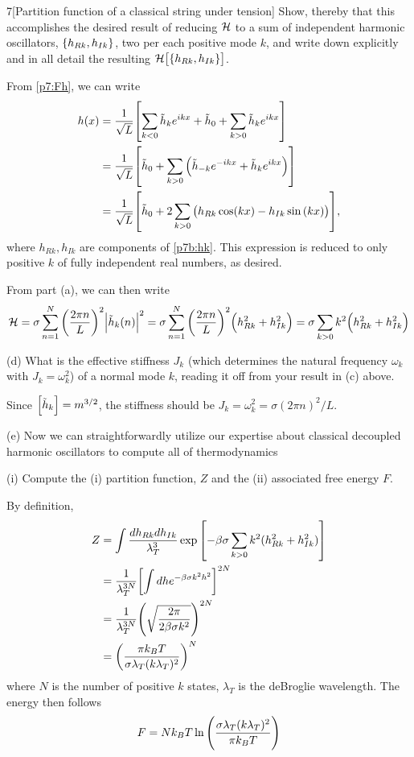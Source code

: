 \documentclass[12pt]{article}
\begin{document}
\begin{problem}{7}[Partition function of a classical string under tension]
Show, thereby that this accomplishes the desired result of reducing $\mathcal{H}$ to a
sum of independent harmonic oscillators, $\qty{h_{Rk},h_{Ik}}$, two per each
positive mode $k$, and write down explicitly and in all detail the resulting
$\mathcal{H}\qty[\qty{h_{Rk},h_{Ik}}]$.
\begin{solution}
From \eqref{p7:Fh}, we can write
\begin{align}
h(x)
&=\frac1{\sqrt{L}}\qty[\sum_{k<0}\tilde{h}_ke^{ikx}+\tilde{h}_0+\sum_{k>0}\tilde{h}_ke^{ikx}]\notag\\
&=\frac1{\sqrt{L}}\qty[
\tilde{h}_0+\sum_{k>0}\qty(\tilde{h}_{-k}e^{-ikx}+\tilde{h}_ke^{ikx})
]\notag\\
&=\frac1{\sqrt{L}}
\qty[
\tilde{h}_0
+2\sum_{k>0}\qty(h_{Rk}\cos(kx)-h_{Ik}\sin\qty(kx))
],
\end{align}
where $h_{Rk},h_{Ik}$ are components of \eqref{p7b:hk}. This expression is
reduced to only positive $k$ of fully independent real numbers, as desired.

From part (a), we can then write
\begin{equation}
    \mathcal{H}=\sigma\sum_{n=1}^N\qty(\frac{2\pi n}{L})^2\abs{\tilde{h}_k(n)}^2
    =\sigma\sum_{n=1}^N\qty(\frac{2\pi n}{L})^2\qty(h_{Rk}^2+h_{Ik}^2)
    =\sigma\sum_{k>0}k^2\qty(h_{Rk}^2+h_{Ik}^2)
\end{equation}
\end{solution}

(d) What is the effective stiffness $J_k$ (which determines the natural
frequency $\omega_k$ with $J_k=\omega_k^2$) of a normal mode $k$, reading it off
from your result in (c) above.

\begin{solution}
Since $\qty[\tilde{h}_k]=m^{3/2}$, the stiffness should be
$J_k=\omega_k^2=\sigma(2\pi n)^2/L$. 
\end{solution}

(e) Now we can straightforwardly utilize our expertise about classical decoupled
harmonic oscillators to compute all of thermodynamics

\qquad(i) Compute the (i) partition function, $Z$ and the (ii) associated free
energy $F$.
\begin{solution}
By definition,
\begin{align}
Z&=\int\frac{dh_{Rk}dh_{Ik}}{\lambda_T^3}\exp\qty[-\beta\sigma\sum_{k>0}k^2(h_{Rk}^2+h_{Ik}^2)]\notag\\
 &=\frac1{\lambda_T^{3N}}\qty[\int dh e^{-\beta\sigma k^2h^2}]^{2N}\notag\\
 &=\frac1{\lambda_T^{3N}}\qty(\sqrt{\frac{2\pi}{2\beta\sigma k^2}})^{2N}\notag\\
 &=\qty(\frac{\pi k_BT}{\sigma\lambda_T(k\lambda_T)^2})^N
\end{align}
where $N$ is the number of positive $k$ states, $\lambda_T$ is the deBroglie
wavelength. The energy then follows
\begin{equation}
    F=Nk_BT\ln\qty(\frac{\sigma\lambda_T(k\lambda_T)^2}{\pi k_BT})
\end{equation}


\end{solution}
\end{problem}
\end{document}
